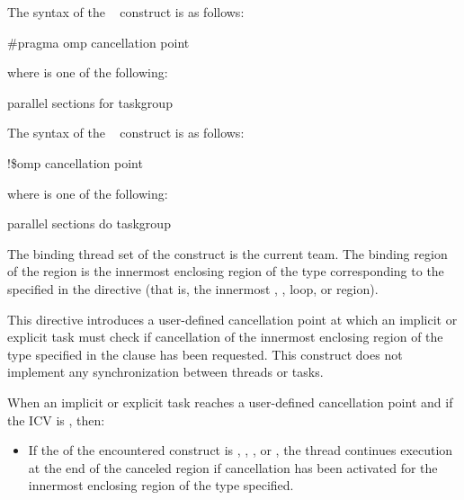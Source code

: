 {{{{\syntax
\ccppspecificstart
The syntax of the ~ construct is as follows:

\begin{boxedcode}
\#pragma omp cancellation point 
\end{boxedcode}

where  is one of the following:

\begin{indentedcodelist}
parallel
sections
for
taskgroup
\end{indentedcodelist}
\ccppspecificend

\fortranspecificstart
The syntax of the ~ construct is as follows:

\begin{boxedcode}
!\$omp cancellation point 
\end{boxedcode}

where  is one of the following:

\begin{indentedcodelist}
parallel
sections
do
taskgroup
\end{indentedcodelist}
\fortranspecificend

\binding
The binding thread set of the  construct is the current team.
The binding region of the  region is the innermost enclosing region of the type corresponding to the  
specified in the directive (that is, the innermost , , loop, or 
 region).

\descr
This directive introduces a user-defined cancellation point at which an implicit or 
explicit task must check if cancellation of the innermost enclosing region of the type 
specified in the clause has been requested. This construct does not implement any 
synchronization between threads or tasks.

When an implicit or explicit task reaches a user-defined cancellation point and if 
the  ICV is , then:
\begin{itemize}
\item If the  of the encountered  construct is , , , or ,
the thread continues execution at the end of the canceled region if 
cancellation has been activated for the innermost enclosing region of 
the type specified.


\end{itemize}}}}}
